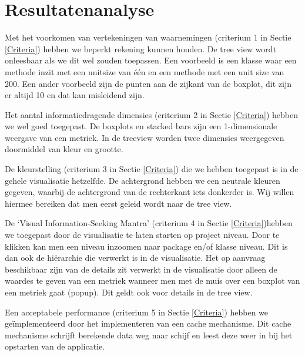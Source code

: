 \documentclass[a4paper]{article}
\begin{document}
\section{Resultatenanalyse}
Met het voorkomen van vertekeningen van waarnemingen (criterium 1 in Sectie \ref{Criteria}) hebben we beperkt rekening kunnen houden. De tree view wordt onleesbaar als we dit wel zouden toepassen. Een voorbeeld is een klasse waar een methode inzit met een unitsize van één en een methode met een unit size van 200.
Een ander voorbeeld zijn de punten aan de zijkant van de boxplot, dit zijn er altijd 10 en dat kan misleidend zijn.

Het aantal informatiedragende dimensies (criterium 2 in Sectie \ref{Criteria}) hebben we wel goed toegepast. De boxplots en stacked bars zijn een 1-dimensionale weergave van een metriek. In de treeview worden twee dimensies weergegeven doormiddel van kleur en grootte. 

De kleurstelling (criterium 3 in Sectie \ref{Criteria}) die we hebben toegepast is in de gehele visualisatie hetzelfde.  De achtergrond hebben we een neutrale kleuren gegeven, waarbij de achtergrond van de rechterkant iets donkerder is. Wij willen hiermee bereiken dat men eerst geleid wordt naar de tree view.

De `Visual Information-Seeking Mantra' (criterium 4 in Sectie \ref{Criteria})hebben we toegepast door de visualisatie te laten starten op project niveau. Door te klikken kan men een niveau inzoomen naar package en/of klasse niveau. Dit is dan ook de hiërarchie die verwerkt is in de visualisatie. Het op aanvraag beschikbaar zijn van de details zit verwerkt in de visualisatie door alleen de waardes te geven van een metriek wanneer men met de muis over een boxplot van een metriek gaat (popup). Dit geldt ook voor details in de tree view.

Een acceptabele performance (criterium 5 in Sectie \ref{Criteria}) hebben we geïmplementeerd door het implementeren van een cache mechanisme. Dit cache mechanisme \mbox{schrijft} berekende data weg naar schijf en leest deze weer in bij het opstarten van de applicatie.



\end{document}
